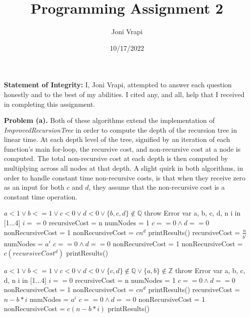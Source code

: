 \documentclass{article}
\title{Programming Assignment 2}
\author{Joni Vrapi}
\date{10/17/2022}
\begin{document}
\maketitle

\textbf{Statement of Integrity:} I, Joni Vrapi, attempted to answer each question honestly and to the best of my abilities. I cited any, and all, help that I received in completing this assignment.

\hfill

\textbf{Problem (a).} Both of these algorithms extend the implementation of \emph{ImprovedRecursionTree} in order to compute the depth of the recursion tree in linear time. At each depth level of the tree, signified by an iteration of each function's main for-loop, the recursive cost, and non-recursive cost at a node is computed. The total non-recursive cost at each depth is then computed by multiplying across all nodes at that depth. A slight quirk in both algorithms, in order to handle constant time non-recursive costs, is that when they receive zero as an input for both $c$ and $d$, they assume that the non-recursive cost is a constant time operation. 

\begin{codebox}
    \li \If $a < 1 \lor b <= 1 \lor c < 0 \lor d < 0 \lor \{b,c,d\} \not \in \mathbb{Q}$ \Then
    \li throw Error \End
    \li var a, b, c, d, n
    \li \For i in [1...4] \Do
    \li \If $i == 0$ \Then
        \li recursiveCost = n
        \li numNodes = 1
        \li \If $c == 0 \land d == 0$ \Then
            \li nonRecursiveCost = 1
            \li \Else 
            \li nonRecursiveCost = $cn^d$ \End
        \li printResults()
        \li \Else
        \li recursiveCost = $\frac{n}{b^i}$
        \li numNodes = $a^i$
        \li \If $c == 0 \land d == 0$ \Then
            \li nonRecursiveCost = 1
            \li \Else 
            \li nonRecursiveCost = $c(recursiveCost^d)$ \End
            \li printResults()
        \li \End
        \li \End
\end{codebox}

\hfill

\begin{codebox}
    \li \If $a < 1 \lor b <= 1 \lor c < 0 \lor d < 0 \lor \{c,d\} \not \in \mathbb{Q} \lor \{a,b\} \not \in \mathbb{Z}$ \Then
    \li throw Error \End
    \li var a, b, c, d, n
    \li \For i in [1...4] \Do
    \li \If $i == 0$ \Then
        \li recursiveCost = n
        \li numNodes = 1
        \li \If $c == 0 \land d == 0$ \Then
            \li nonRecursiveCost = 1
            \li \Else 
            \li nonRecursiveCost = $cn^d$ \End
        \li printResults()
        \li \Else
        \li recursiveCost = $n - b*i$
        \li numNodes = $a^i$
        \li \If $c == 0 \land d == 0$ \Then
            \li nonRecursiveCost = 1
            \li \Else 
            \li nonRecursiveCost = $c(n - b*i)$ \End
            \li printResults()
        \li \End
        \li \End
\end{codebox}
\end{document}
